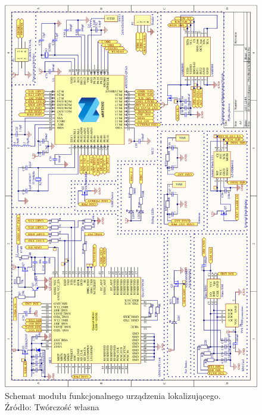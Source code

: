 \begin{figure}[H]
	\centering
	\includegraphics[width=14cm]{img/schematics/mainboard_fixed.png}
	\caption{Schemat modułu funkcjonalnego urządzenia lokalizującego. \\ Źródło: Twórczość własna}
	\label{fig:image_mainboard_functional_schematic}
\end{figure}

